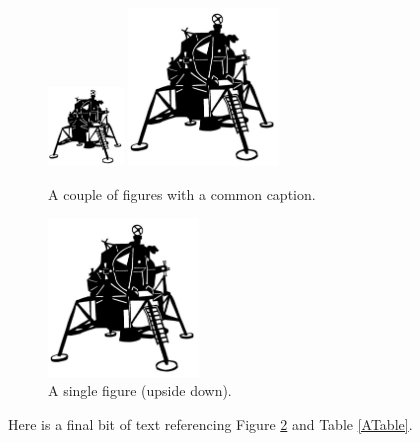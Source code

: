 \documentclass[12pt,letterpaper]{article}
\begin{document}
\begin{figure}[h]
\begin{center}
\includegraphics[width=2cm]{LM.jpg}
\includegraphics[width=4cm]{LM.jpg}
\caption{A couple of figures with a common caption.}
\label{TwoFigs}
\end{center}
\end{figure}

\begin{figure}[h]
\begin{center}
\includegraphics[width=4cm,angle=180]{LM.jpg}
\caption{A single figure (upside down).}
\label{SingleFig}
\end{center}
\end{figure}

Here is a final bit of text referencing Figure \ref{SingleFig} and Table
\ref{ATable}.




\end{document}
